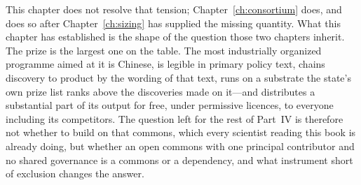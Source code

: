 This chapter does not resolve that tension; Chapter~\ref{ch:consortium} does, and does so after Chapter~\ref{ch:sizing} has supplied the missing quantity. What this chapter has established is the shape of the question those two chapters inherit. The prize is the largest one on the table. The most industrially organized programme aimed at it is Chinese, is legible in primary policy text, chains discovery to product by the wording of that text, runs on a substrate the state's own prize list ranks above the discoveries made on it---and distributes a substantial part of its output for free, under permissive licences, to everyone including its competitors. The question left for the rest of Part~IV is therefore not whether to build on that commons, which every scientist reading this book is already doing, but whether an open commons with one principal contributor and no shared governance is a commons or a dependency, and what instrument short of exclusion changes the answer.
